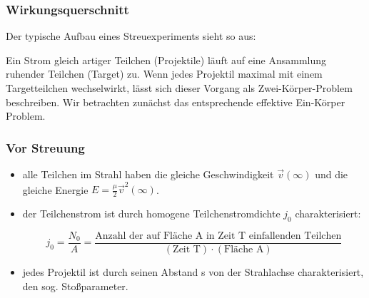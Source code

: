 \documentclass[10pt, letterpaper]{article}
\begin{document}
\subsubsection{Wirkungsquerschnitt}

Der typische Aufbau eines Streuexperiments sieht so aus:

\begin{center}
\end{center}

Ein Strom gleich artiger Teilchen (Projektile) läuft auf eine Ansammlung ruhender Teilchen (Target) zu. Wenn jedes Projektil maximal mit einem Targetteilchen wechselwirkt, lässt sich dieser Vorgang als Zwei-Körper-Problem beschreiben. Wir betrachten zunächst das entsprechende effektive Ein-Körper Problem.
\subsubsection{Vor Streuung}

\begin{itemize}
\item alle Teilchen im Strahl haben die gleiche Geschwindigkeit $\vec{v}(\infty)$ und die gleiche Energie $E = \frac{\mu}{2}\vec{v}^2(\infty)$.

\item der Teilchenstrom ist durch homogene Teilchenstromdichte $j_0$ charakterisiert:

\[
j_0 = \frac{N_0}{A} = \frac{\text{Anzahl der auf Fläche A in Zeit T}\text{ einfallenden Teilchen}}{(\text{Zeit T}) \cdot (\text{Fläche A})}
\]

\item jedes Projektil ist durch seinen Abstand s von der Strahlachse charakterisiert, den sog. Stoßparameter.
\end{itemize}
\end{document}
